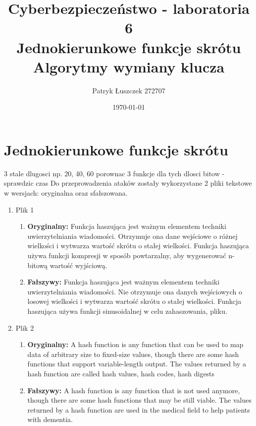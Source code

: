 \documentclass{article}
\title{%
  Cyberbezpieczeństwo - laboratoria 6 \\
  \large Jednokierunkowe funkcje skrótu \\ Algorytmy wymiany klucza
  }
\author{Patryk Łuszczek 272707}
\date{\today}
\begin{document}
\maketitle
\newpage
\tableofcontents
\newpage

\section{Jednokierunkowe funkcje skrótu}
3 stale dlugosci np. 20, 40, 60
porownac 3 funkcje dla tych dlosci bitow - sprawdzic czas
Do przeprowadzenia ataków zostały wykorzystane 2 pliki tekstowe w wersjach: oryginalna oraz sfałszowana.
\begin{enumerate}
  \item Plik 1
        \begin{enumerate}
          \item \textbf{Oryginalny: } Funkcja haszująca jest ważnym elementem techniki uwierzytelniania wiadomości.
                Otrzymuje ona dane wejściowe o różnej wielkości i wytwarza wartość skrótu o stałej
                wielkości.
                Funkcja haszująca używa funkcji kompresji w sposób powtarzalny, aby
                wygenerować n-bitową wartość wyjściową.
          \item \textbf{Fałszywy: } Funkcja haszująca jest ważnym elementem techniki uwierzytelniania wiadomości.
                Nie otrzymuje ona danych wejściowych o losowej wielkości i wytwarza wartość skrótu o stałej wielkości.
                Funkcja haszująca używa funkcji sinusoidalnej w celu zahaszowania, pliku.
        \end{enumerate}
  \item Plik 2
        \begin{enumerate}
          \item \textbf{Oryginalny: } A hash function is any function that can be used to map data of arbitrary size to fixed-size values, though there are some hash functions that support variable-length output.
                The values returned by a hash function are called hash values, hash codes, hash digests
          \item \textbf{Fałszywy: } A hash function is any function that is not used anymore, though there are some hash functions that may be still viable.
                The values returned by a hash function are used in the medical field to help patients with dementia.
        \end{enumerate}
\end{enumerate}
\end{document}
